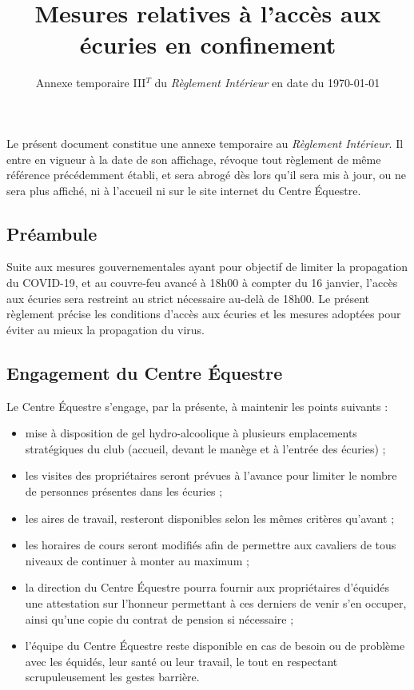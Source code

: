\documentclass[11pt,a4paper]{article}
\title{Mesures relatives à l'accès aux écuries en confinement}
\subtitle{Annexe temporaire III$^T$ du \textit{Règlement Intérieur} en date du \today}
\author{}
\date{}
\begin{document}
\maketitle


Le présent document constitue une annexe temporaire au \textit{Règlement Intérieur}. Il entre en vigueur à la date de son affichage, révoque tout règlement de même référence précédemment établi, et sera abrogé dès lors qu'il sera mis à jour, ou ne sera plus affiché, ni à l'accueil ni sur le site internet du Centre Équestre.

\subsection*{Préambule}
	Suite aux mesures gouvernementales ayant pour objectif de limiter la propagation du COVID-19, et au couvre-feu avancé à 18h00 à compter du 16 janvier, l'accès aux écuries sera restreint au strict nécessaire au-delà de 18h00. Le présent règlement précise les conditions d'accès aux écuries et les mesures adoptées pour éviter au mieux la propagation du virus.
\subsection*{Engagement du Centre Équestre}
	Le Centre Équestre s'engage, par la présente, à maintenir les points suivants :
	\begin{itemize}
		\item mise à disposition de gel hydro-alcoolique à plusieurs emplacements stratégiques du club (accueil, devant le manège et à l'entrée des écuries) ;
		\item les visites des propriétaires seront prévues à l'avance pour limiter le nombre de personnes présentes dans les écuries ;
		\item les aires de travail, resteront disponibles selon les mêmes critères qu'avant ;
		\item les horaires de cours seront modifiés afin de permettre aux cavaliers de tous niveaux de continuer à monter au maximum ;
		\item la direction du Centre Équestre pourra fournir aux propriétaires d'équidés une attestation sur l'honneur permettant à ces derniers de venir s'en occuper, ainsi qu'une copie du contrat de pension si nécessaire ;
		\item l'équipe du Centre Équestre reste disponible en cas de besoin ou de problème avec les équidés, leur santé ou leur travail, le tout en respectant scrupuleusement les gestes barrière.
	\end{itemize}
\end{document}
